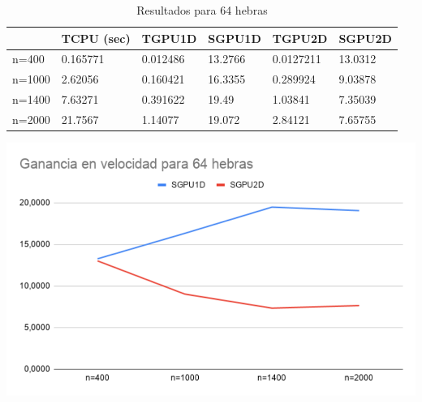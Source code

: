 \begin{table}[H]
	\centering
	\begin{tabular}{|l|l|l|l|l|l|}
		\hline
		& \cellcolor[HTML]{ECF4FF}TCPU (sec) & \cellcolor[HTML]{ECF4FF}TGPU1D & \cellcolor[HTML]{ECF4FF}SGPU1D & \cellcolor[HTML]{ECF4FF}TGPU2D & \cellcolor[HTML]{ECF4FF}SGPU2D \\ \hline
		\cellcolor[HTML]{FFFFC7}n=400  & 0.165771                           & 0.012486                       & 13.2766                        & 0.0127211                      & 13.0312                        \\ \hline
		\cellcolor[HTML]{FFFFC7}n=1000 & 2.62056                            & 0.160421                       & 16.3355                        & 0.289924                       & 9.03878                        \\ \hline
		\cellcolor[HTML]{FFFFC7}n=1400 & 7.63271                            & 0.391622                       & 19.49                          & 1.03841                        & 7.35039                        \\ \hline
		\cellcolor[HTML]{FFFFC7}n=2000 & 21.7567                            & 1.14077                        & 19.072                         & 2.84121                        & 7.65755                        \\ \hline
	\end{tabular}
	\caption{Resultados para 64 hebras}
\end{table}

\begin{center}
	\includegraphics[scale=0.5]{img/g64}
\end{center}

